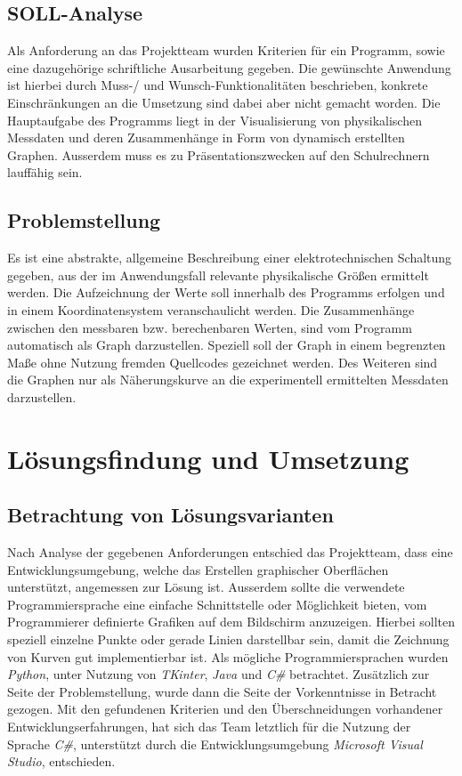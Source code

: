\documentclass{article}
\begin{document}
\subsection{SOLL-Analyse}

	Als Anforderung an das Projektteam wurden Kriterien für ein Programm, sowie eine dazugehörige schriftliche Ausarbeitung gegeben. Die gewünschte Anwendung ist hierbei durch Muss-/ und Wunsch-Funktionalitäten beschrieben, konkrete Einschränkungen an die Umsetzung sind dabei aber nicht gemacht worden. Die Hauptaufgabe des Programms liegt in der Visualisierung von physikalischen Messdaten und deren Zusammenhänge in Form von dynamisch erstellten Graphen. Ausserdem muss es zu Präsentationszwecken auf den Schulrechnern lauffähig sein.

\subsection{Problemstellung}

	Es ist eine abstrakte, allgemeine Beschreibung einer elektrotechnischen Schaltung gegeben, aus der im Anwendungsfall relevante physikalische Größen ermittelt werden. Die Aufzeichnung der Werte soll innerhalb des Programms erfolgen und in einem Koordinatensystem veranschaulicht werden. Die Zusammenhänge zwischen den messbaren bzw. berechenbaren Werten, sind vom Programm automatisch als Graph darzustellen. Speziell soll der Graph in einem begrenzten Maße ohne Nutzung fremden Quellcodes gezeichnet werden. Des Weiteren sind die Graphen nur als Näherungskurve an die experimentell ermittelten Messdaten darzustellen.

\newpage
\section{Lösungsfindung und Umsetzung}

\subsection{Betrachtung von Lösungsvarianten}

	Nach Analyse der gegebenen Anforderungen entschied das Projektteam, dass eine Entwicklungsumgebung, welche das Erstellen graphischer Oberflächen unterstützt, angemessen zur Lösung ist. Ausserdem sollte die verwendete Programmiersprache eine einfache Schnittstelle oder Möglichkeit bieten, vom Programmierer definierte Grafiken auf dem Bildschirm anzuzeigen. Hierbei sollten speziell einzelne Punkte oder gerade Linien darstellbar sein, damit die Zeichnung von Kurven gut implementierbar ist.
	Als mögliche Programmiersprachen wurden \textit{\glqq Python\grqq{}}, unter Nutzung von \textit{\glqq TKinter\grqq{}}, \textit{\glqq Java\grqq{}}  und \textit{\glqq C\#\grqq{}} betrachtet.
	Zusätzlich zur Seite der Problemstellung, wurde dann die Seite der Vorkenntnisse in Betracht gezogen. Mit den gefundenen Kriterien und den Überschneidungen vorhandener Entwicklungserfahrungen, hat sich das Team letztlich für die Nutzung der Sprache \textit{\glqq C\#\grqq{}}, unterstützt durch die Entwicklungsumgebung \textit{\glqq Microsoft Visual Studio\grqq{}}, entschieden.
\end{document}
